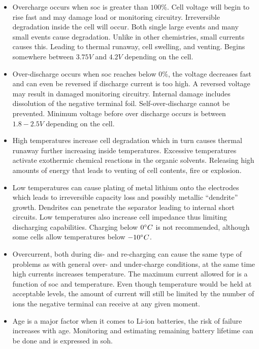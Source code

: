 \begin{itemize}
\item Overcharge occurs when \gls{soc} is greater than $100\%$. Cell voltage will begin to rise fast and may damage load or monitoring circuitry. Irreversible degradation inside the cell will occur. Both single large events and many small events cause degradation. Unlike in other chemistries, small currents causes this. Leading to thermal runaway, cell swelling, and venting. Begins somewhere between $3.75V$ and $4.2V$ depending on the cell.
\item Over-discharge occurs when \gls{soc} reaches below $0\%$, the voltage decreases fast and can even be reversed if discharge current is too high. A reversed voltage may result in damaged monitoring circuitry. Internal damage includes dissolution of the negative terminal foil. Self-over-discharge cannot be prevented. Minimum voltage before over discharge occurs is between $1.8-2.5V$ depending on the cell.
\item High temperatures increase cell degradation which in turn causes thermal runaway further increasing inside temperatures. Excessive temperatures activate exothermic chemical reactions in the organic solvents. Releasing high amounts of energy that leads to venting of cell contents, fire or explosion.
\item Low temperatures can cause plating of metal lithium onto the electrodes which leads to irreversible capacity loss and possibly metallic ``dendrite'' growth. Dendrites can penetrate the separator leading to internal short circuits. Low temperatures also increase cell impedance thus limiting discharging capabilities. Charging below $0\degree C$ is not recommended, although some cells allow temperatures below $-10\degree C$.
\item Overcurrent, both during dis- and re-charging can cause the same type of problems as with general over- and under-charge conditions, at the same time high currents increases temperature. The maximum current allowed for is a function of \gls{soc} and temperature. Even though temperature would be held at acceptable levels, the amount of current will still be limited by the number of ions the negative terminal can receive at any given moment.
\item Age is a major factor when it comes to Li-ion batteries, the risk of failure increases with age. Monitoring and estimating remaining battery lifetime can be done and is expressed in \gls{soh}.
\end{itemize}

